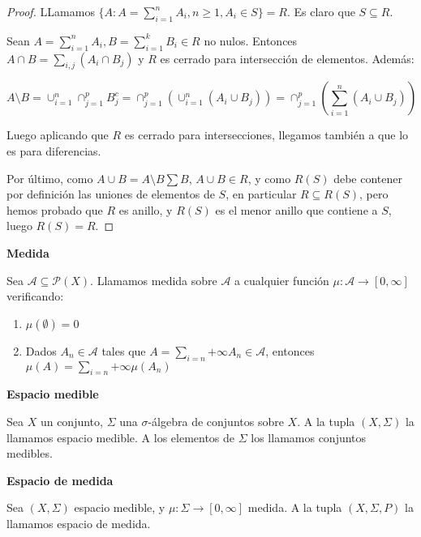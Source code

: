 \begin{proof}
 LLamamos $\{A: A=\sum_{i=1}^n A_i, n\ge 1, A_i \in S\} = R$. Es claro que $S\subseteq R$.
 
 Sean $A = \sum_{i=1}^n A_i, B = \sum_{i=1}^k B_i \in R$ no nulos. Entonces $A\cap B = \sum_{i,j} (A_i \cap B_j)$ y $R$
 es cerrado para intersección de elementos. Además:
 
 \[A\setminus B = \cup_{i=1}^n \cap_{j=1}^p B_j^c = \cap_{j=1}^p \left(\cup_{i=1}^n (A_i \cup B_j)\right) = \cap_{j=1}^p \left(\sum_{i=1}^n (A_i \cup B_j)\right)\]
 
 Luego aplicando que $R$ es cerrado para intersecciones, llegamos también a que lo es para diferencias.
 
 Por último, como $A\cup B = A \setminus B \sum B$, $A \cup B \in R$, y como $R(S)$ debe contener por definición
 las uniones de elementos de $S$, en particular $R\subseteq R(S)$, pero hemos probado que $R$ es anillo, y $R(S)$
 es el menor anillo que contiene a $S$, luego $R(S) = R$.
\end{proof}


\begin{definition} \textbf{Medida}

 Sea $\mathcal{A} \subseteq \mathcal{P}(X)$. Llamamos medida sobre $\mathcal{A}$ a cualquier función 
 $\mu: \mathcal{A} \rightarrow [0, \infty]$ verificando:

 \begin{enumerate}[i]
  \item $\mu(\emptyset) = 0$
  \item Dados $A_n \in \mathcal{A}$ tales que $A = \sum_{i=n}{+\infty} A_n \in \mathcal{A}$, entonces 
  $\mu(A)= \sum_{i=n}{+\infty} \mu(A_n)$
 \end{enumerate}
\end{definition}

\begin{definition} \textbf{Espacio medible}

 Sea $X$ un conjunto, $\Sigma$ una $\sigma$-álgebra de conjuntos sobre $X$. A la tupla $(X,\Sigma)$ la llamamos
 espacio medible. A los elementos de $\Sigma$ los llamamos conjuntos medibles.
\end{definition}


\begin{definition} \textbf{Espacio de medida}

 Sea $(X, \Sigma)$ espacio medible, y $\mu: \Sigma \rightarrow [0,\infty]$ medida. A la tupla $(X, \Sigma, P)$ 
 la llamamos espacio de medida.
\end{definition}


